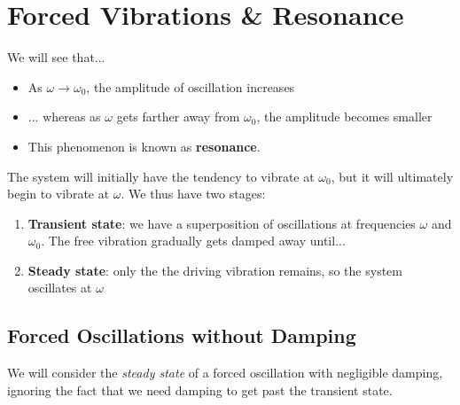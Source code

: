 \chapter{Forced Vibrations \& Resonance}

\vspace{0.5em}

We will see that...
\begin{itemize}
	\item As $\omega \to \omega_0$, the amplitude of oscillation increases
	\item ... whereas as $\omega$ gets farther away from $\omega_0$, the amplitude becomes smaller
	\item This phenomenon is known as \textbf{resonance}.
\end{itemize}

The system will initially have the tendency to vibrate at $\omega_0$, but it will ultimately begin to vibrate at $\omega$. We thus have two stages:
\begin{enumerate}
	\item \textbf{Transient state}: we have a superposition of oscillations at frequencies $\omega$ and $\omega_0$. The free vibration gradually gets damped away until...
	\item \textbf{Steady state}: only the the driving vibration remains, so the system oscillates at $\omega$
\end{enumerate}

\section{Forced Oscillations without Damping}
We will consider the \emph{steady state} of a forced oscillation with negligible damping, ignoring the fact that we need damping to get past the transient state.


